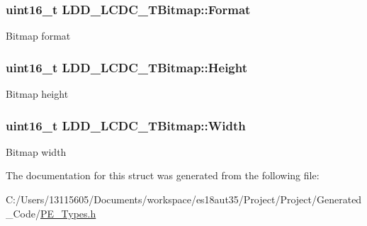 \subsubsection[{Format}]{\setlength{\rightskip}{0pt plus 5cm}uint16\+\_\+t L\+D\+D\+\_\+\+L\+C\+D\+C\+\_\+\+T\+Bitmap\+::\+Format}\label{struct_l_d_d___l_c_d_c___t_bitmap_a8f886a6ce6e67d4b070c20bdd5ce495a}
Bitmap format \hypertarget{struct_l_d_d___l_c_d_c___t_bitmap_a13fea31674709c4f681e6c86d3b71206}{}
\subsubsection[{Height}]{\setlength{\rightskip}{0pt plus 5cm}uint16\+\_\+t L\+D\+D\+\_\+\+L\+C\+D\+C\+\_\+\+T\+Bitmap\+::\+Height}\label{struct_l_d_d___l_c_d_c___t_bitmap_a13fea31674709c4f681e6c86d3b71206}
Bitmap height \hypertarget{struct_l_d_d___l_c_d_c___t_bitmap_af88017bd29e49292265c1fda6dc5463d}{}
\subsubsection[{Width}]{\setlength{\rightskip}{0pt plus 5cm}uint16\+\_\+t L\+D\+D\+\_\+\+L\+C\+D\+C\+\_\+\+T\+Bitmap\+::\+Width}\label{struct_l_d_d___l_c_d_c___t_bitmap_af88017bd29e49292265c1fda6dc5463d}
Bitmap width 

The documentation for this struct was generated from the following file\+:\begin{DoxyCompactItemize}
\item 
C\+:/\+Users/13115605/\+Documents/workspace/es18aut35/\+Project/\+Project/\+Generated\+\_\+\+Code/\hyperlink{_p_e___types_8h}{P\+E\+\_\+\+Types.\+h}\end{DoxyCompactItemize}
